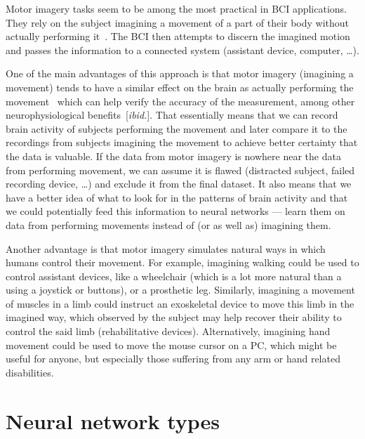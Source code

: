 \documentclass[english, he, bc, kiv, iso690alph]{fasthesis}
\begin{document}
Motor imagery tasks seem to be among the most practical in BCI applications. 
They rely on the subject imagining a movement of a part of their body without actually performing it~\cite{craik:dl:eeg:rev:19}.
The BCI then attempts to discern the imagined motion and passes the information to a connected system (assistant device, computer, \dots).

One of the main advantages of this approach is that motor imagery (imagining a movement) tends to have a similar effect on the brain as actually performing the movement~\cite{pfurtscheller:mi:01} which can help verify the accuracy of the measurement, among other neurophysiological benefits~[\emph{ibid.}].
That essentially means that we can record brain activity of subjects performing the movement and later compare it to the recordings from subjects imagining the movement to achieve better certainty that the data is valuable. If the data from motor imagery is nowhere near the data from performing movement, we can assume it is flawed (distracted subject, failed recording device, \dots) and exclude it from the final dataset.
It also means that we have a better idea of what to look for in the patterns of brain activity and that we could potentially feed this information to neural networks --- learn them on data from performing movements instead of (or as well as) imagining them.

Another advantage is that motor imagery simulates natural ways in which humans control their movement.	For example, imagining walking could be used to control assistant devices, like a wheelchair (which is a lot more natural than a using a joystick or buttons), or a prosthetic leg. Similarly, imagining a movement of muscles in a limb could instruct an exoskeletal device to move this limb in the imagined way, which observed by the subject may help recover their ability to control the said limb (rehabilitative devices). Alternatively, imagining hand movement could be used to move the mouse cursor on a PC, which might be useful for anyone, but especially those suffering from any arm or hand related disabilities.


\section{Neural network types}

\end{document}
